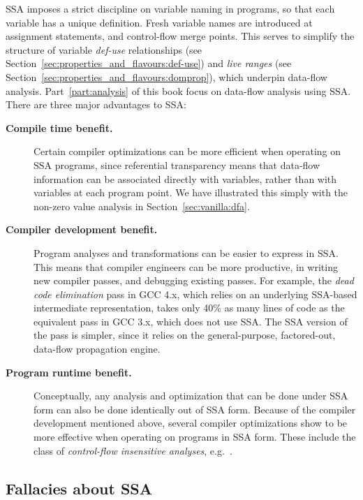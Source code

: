 SSA imposes a strict discipline on variable naming in programs, so that each variable has a unique definition. 
Fresh variable names are introduced at assignment statements, and control-flow merge points. 
This serves to simplify the structure of variable \emph{def-use} relationships (see Section~\ref{sec:properties_and_flavours:def-use}) and \emph{live ranges} (see Section~\ref{sec:properties_and_flavours:domprop}), which underpin data-flow analysis. 
Part~\ref{part:analysis} of this book focus on data-flow analysis using SSA. 
There are three major advantages to SSA:
\begin{description}
\item[\textbf{Compile time benefit.}] 
  Certain compiler optimizations can be more efficient when operating on SSA programs, since referential transparency means that data-flow information can be associated directly with variables, rather than with variables at each program point. 
  We have illustrated this simply with the non-zero value analysis in Section~\ref{sec:vanilla:dfa}.
\item[\textbf{Compiler development benefit.}] 
  Program analyses and transformations can be easier to express in SSA. 
  This means that compiler engineers can be more productive, in writing new compiler passes, and debugging existing passes. 
  For example, the \textit{dead code elimination} pass in GCC 4.x, which relies on an underlying SSA-based intermediate representation, takes only 40\% as many lines of code as the equivalent pass in GCC 3.x, which does not use SSA. 
  The SSA version of the pass is simpler, since it relies on the general-purpose, factored-out, data-flow propagation engine.
\item[\textbf{Program runtime benefit.}] 
  Conceptually, any analysis and optimization that can be done under SSA form can also be done identically out of SSA form. 
  Because of the compiler development mentioned above, several compiler optimizations show to be more effective when operating on programs in SSA form. 
  These include the class of \textit{control-flow insensitive analyses}, e.g.\ \cite{hasti98using}.
\end{description}


\vspace{-2ex}
\subsection{Fallacies about SSA}
\vspace{-1mm}

